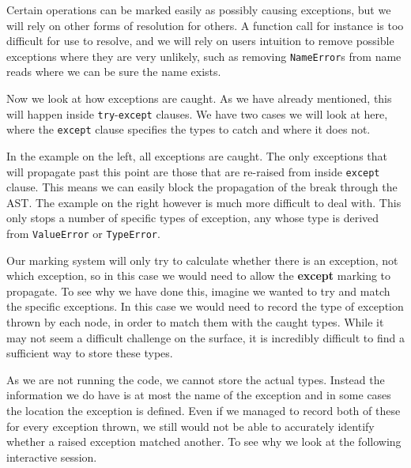 \documentclass{report}
\begin{document}
Certain operations can be marked easily as possibly causing exceptions, but we will rely on other forms of resolution for others. A function call for instance
is too difficult for use to resolve, and we will rely on users intuition to remove possible exceptions where they are very unlikely, such as removing
\texttt{NameError}s from name reads where we can be sure the name exists.

Now we look at how exceptions are caught. As we have already mentioned, this will happen inside \texttt{try}-\texttt{except} clauses. We have two cases we
will look at here, where the \texttt{except} clause specifies the types to catch and where it does not.

\begin{minipage}[b]{0.4\linewidth}
\centering

\end{minipage}
\hspace{1cm}
\begin{minipage}[b]{0.5\linewidth}
\centering

\end{minipage}

In the example on the left, all exceptions are caught. The only exceptions that will propagate past this point are those that are re-raised from inside
\texttt{except} clause. This means we can easily block the propagation of the break through the AST. The example on the right however is much more difficult
to deal with. This only stops a number of specific types of exception, any whose type is derived from \texttt{ValueError} or \texttt{TypeError}.

Our marking system will only try to calculate whether there is an exception, not which exception, so in this case we would need to allow the \textbf{except}
marking to propagate. To see why we have done this, imagine we wanted to try and match the specific exceptions. In this case we would need to record the type
of exception thrown by each node, in order to match them with the caught types. While it may not seem a difficult challenge on the surface, it is incredibly
difficult to find a sufficient way to store these types.

As we are not running the code, we cannot store the actual types. Instead the information we do have is at most the name of the exception and in some cases
the location the exception is defined. Even if we managed to record both of these for every exception thrown, we still would not be able to accurately identify
whether a raised exception matched another. To see why we look at the following interactive session.
\end{document}
